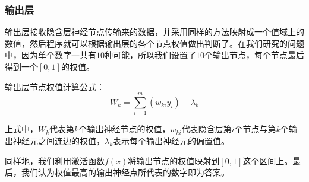 ﻿\documentclass[UTF8]{ctexart}
\begin{document}
        \subsubsection{输出层}
输出层接收隐含层神经节点传输来的数据，并采用同样的方法映射成一个值域上的数值，然后程序就可以根据输出层的各个节点权值做出判断了。在我们研究的问题中，因为单个数字一共有$10$种可能，所以我们设置了$10$个输出节点，每个节点最后得到一个$[0,1]$的权值。\par
输出层节点权值计算公式：
$$W_k = \sum _{i=1} ^m (w_{ki}y_i) - \lambda_k$$ \par
上式中，$W_k$代表第$k$个输出神经节点的权值，$w_{ki}$代表隐含层第$i$个节点与第$k$个输出神经元之间连边的权值，$\lambda_k$表示每个输出神经元的偏置值。\par
同样地，我们利用激活函数$f(x)$将输出节点的权值映射到$[0,1]$这个区间上。最后，我们认为权值最高的输出神经点所代表的数字即为答案。\par
\end{document}
